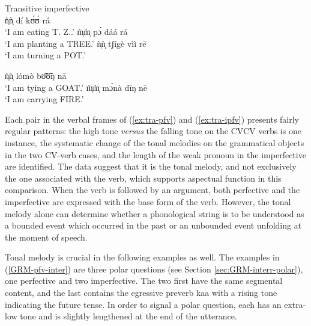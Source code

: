 \begin{exe}
\begin{exe}
\begin{exe}
{\begin{exe}
\begin{exe}
\begin{exe}
\begin{exe}
\begin{exe}
\begin{exe}
\begin{exe}
\begin{exe}
\begin{exe}
\begin{exe}
\begin{exe}
\begin{exe}
\begin{exe}
\begin{exe}
\begin{exe}
\begin{exe}
\begin{exe}
\begin{exe}
\begin{exe}
\begin{multicols}{2}
\z 
 \z

\ea\label{ex:tra-ipfv}{\rm Transitive imperfective}\\

 \ea\label{ex:tra-ipfv-eat}
ǹ̩ǹ̩ dí kʊ́ʊ́ rá\\
`I am eating T. Z..' 
 \ex\label{ex:tra-ipfv-plant}
m̩̀m̩̀ pɔ́ dáá rá\\
`I am planting a TREE.' 
 \ex\label{ex:tra-ipfv-cover}
ǹ̩ǹ̩ tʃígè vìì rē\\
`I am turning  a POT.' 

 \ex\label{ex:tra-ipfv-tie}
ǹ̩ǹ̩ lómò bʊ̃̄ʊ̃̄ŋ nā\\
`I am tying  a GOAT.' 
 \ex\label{ex:tra-ipfv-carry}
m̩̀m̩̀ mɔ́nà dīŋ nē\\
`I am carrying  FIRE.' 

\z 
 \z
 
\end{multicols}


Each pair in the verbal frames of  (\ref{ex:tra-pfv}) and (\ref{ex:tra-ipfv}) 
presents fairly regular patterns:  the high tone {\it versus} the falling tone 
on the CVCV verbs is one instance, the systematic change of the tonal melodies 
on the grammatical objects in the two CV-verb cases, and the length of the weak  
pronoun in the imperfective are identified. The data suggest that it is the 
tonal melody, and not exclusively the one associated with the verb, which 
supports aspectual function in this comparison. When the verb is followed by an 
argument, both perfective and the imperfective are expressed with the base form 
of the verb.  However,  the tonal melody alone  can determine whether a 
phonological string is to be understood as a bounded event which occurred in 
the 
past or an unbounded event unfolding at the moment of speech.



Tonal melody is crucial in the following examples as well. The examples in
(\ref{GRM-pfv-inter}) are three polar questions (see Section
\ref{sec:GRM-interr-polar}), one perfective  and two
imperfective. The two first have the
same segmental content, and the last contains the egressive preverb {\sls kaa}
with a rising tone indicating the future tense.  In order to signal a polar
question, each has  an extra-low tone and is slightly lengthened at the end of
the utterance. 

\ea\label{GRM-pfv-inter}



\end{exe}
\end{exe}
\end{exe}
\end{exe}
\end{exe}
\end{exe}
\end{exe}
\end{exe}
\end{exe}
\end{exe}
\end{exe}
\end{exe}
\end{exe}
\end{exe}
\end{exe}
\end{exe}
\end{exe}
\end{exe}
\end{exe}}
\end{exe}
\end{exe}
\end{exe}
